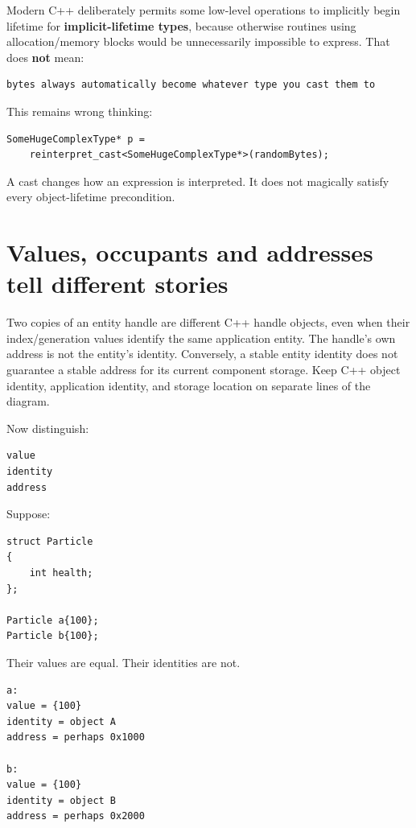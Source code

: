 Modern C++ deliberately permits some low-level operations to implicitly begin lifetime for \textbf{implicit-lifetime types}, because otherwise routines using allocation/memory blocks would be unnecessarily impossible to express. That does \textbf{not} mean:

\begin{verbatim}
bytes always automatically become whatever type you cast them to
\end{verbatim}

This remains wrong thinking:

\begin{verbatim}
SomeHugeComplexType* p =
    reinterpret_cast<SomeHugeComplexType*>(randomBytes);
\end{verbatim}

A cast changes how an expression is interpreted. It does not magically satisfy every object-lifetime precondition.

\section{Values, occupants and addresses tell different stories}\label{01-foundations-i-ch002-values-occupants-and-addresses-tell-different-stories}

Two copies of an entity handle are different C++ handle objects, even when their index/generation values identify the same application entity. The handle's own address is not the entity's identity. Conversely, a stable entity identity does not guarantee a stable address for its current component storage. Keep C++ object identity, application identity, and storage location on separate lines of the diagram.

Now distinguish:

\begin{verbatim}
value
identity
address
\end{verbatim}

Suppose:

\begin{verbatim}
struct Particle
{
    int health;
};

Particle a{100};
Particle b{100};
\end{verbatim}

Their values are equal. Their identities are not.

\begin{verbatim}
a:
value = {100}
identity = object A
address = perhaps 0x1000

b:
value = {100}
identity = object B
address = perhaps 0x2000
\end{verbatim}

